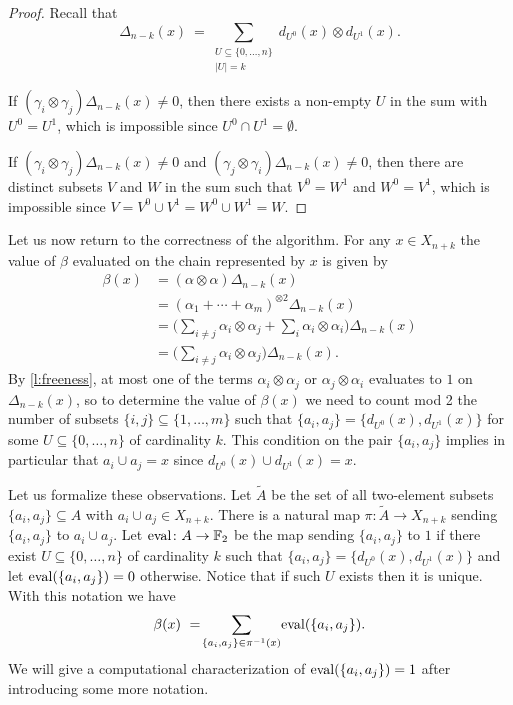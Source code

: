 \begin{proof}
	Recall that
	\begin{equation*}
	\Delta_{n-k}(x) \ = \! \sum_{\substack{U \subseteq \{0, \dots, n\} \\ \vert U \vert = k}}
	d_{U^0}(x) \otimes d_{U^1}(x).
	\end{equation*}
	
	If $(\gamma_i \otimes \gamma_j)\Delta_{n-k}(x) \neq 0$, then there exists a non-empty $U$ in the sum with $U^0 = U^1$, which is impossible since $U^0 \cap U^1 = \emptyset$.
	
	If $(\gamma_i \otimes \gamma_j)\Delta_{n-k}(x) \neq 0$ and $(\gamma_j \otimes \gamma_i)\Delta_{n-k}(x) \neq 0$, then there are distinct subsets $V$ and $W$ in the sum such that $V^0 = W^1$ and $W^0 = V^1$, which is impossible since $V = V^0 \cup V^1 = W^0 \cup W^1 = W$.
\end{proof}

Let us now return to the correctness of the algorithm.
For any $x \in X_{n+k}$ the value of $\beta$ evaluated on the chain represented by $x$ is given by 
\begin{align*}
\beta(x) & =
(\alpha \otimes \alpha) \Delta_{n-k}(x) \\ & =
(\alpha_1 + \cdots + \alpha_m)^{\otimes 2} \Delta_{n-k}(x) \\ & =
\Big(\sum_{i \neq j} \alpha_i \otimes \alpha_j + \sum_{i} \alpha_i \otimes \alpha_i \Big)
\Delta_{n-k}(x) \\ & =
\Big(\sum_{i \neq j} \alpha_i \otimes \alpha_j\Big)
\Delta_{n-k}(x).
\end{align*}
By \cref{l:freeness}, at most one of the terms $\alpha_i \otimes \alpha_j$ or $\alpha_j \otimes \alpha_i$ evaluates to $1$ on $\Delta_{n-k}(x)$, so to determine the value of $\beta(x)$ we need to count mod 2 the number of subsets $\{i,j\} \subseteq \{1,\dots, m\}$ such that $\{a_i, a_j\} = \{d_{U^0}(x), d_{U^1}(x)\}$ for some $U \subseteq \{0, \dots, n\}$ of cardinality $k$.
This condition on the pair $\{a_i, a_j\}$ implies in particular that $a_i \cup a_j = x$ since $d_{U^0}(x) \cup d_{U^1}(x) = x$.

Let us formalize these observations.
Let $\widetilde{A}$ be the set of all two-element subsets $\{a_i, a_j\} \subseteq A$ with $a_i \cup a_j \in X_{n+k}$.
There is a natural map $\pi \colon \widetilde{A} \to X_{n+k}$ sending $\{a_i, a_j\}$ to $a_i \cup a_j$.
Let $\operatorname{eval} \colon A \to \mathbb{F}_2$ be the map sending $\{a_i, a_j\}$ to $1$ if there exist $U \subseteq \{0,\dots,n\}$ of cardinality $k$ such that $\{a_i, a_j\} = \{d_{U^0}(x), d_{U^1}(x)\}$ and let $\operatorname{eval}(\{a_i, a_j\}) = 0$ otherwise.
Notice that if such $U$ exists then it is unique.
With this notation we have
\begin{equation*}
\beta(x) \ = \! \sum_{\{a_i, a_j\} \in \pi^{-1}(x)} \! \operatorname{eval}(\{a_i, a_j\}).
\end{equation*}
We will give a computational characterization of $\operatorname{eval}(\{a_i, a_j\}) = 1$ after introducing some more notation.

